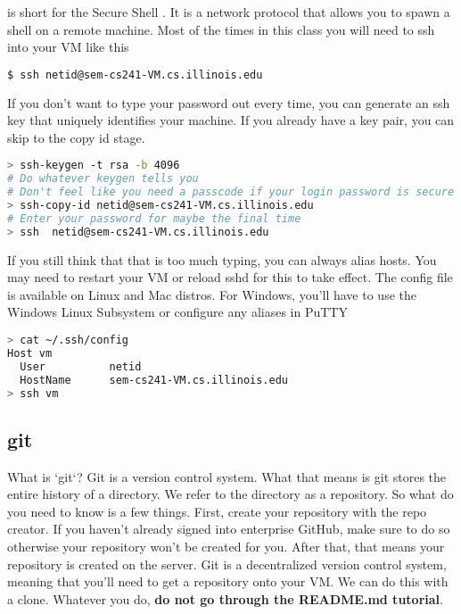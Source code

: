  is short for the Secure Shell \cite{openbsd_ssh}.
It is a network protocol that allows you to spawn a shell on a remote machine.
Most of the times in this class you will need to ssh into your VM like this

\begin{lstlisting}[language=bash]
$ ssh netid@sem-cs241-VM.cs.illinois.edu
\end{lstlisting}

If you don't want to type your password out every time, you can generate an ssh key that uniquely identifies your machine. If you already have a key pair, you can skip to the copy id stage.

\begin{lstlisting}[language=bash]
> ssh-keygen -t rsa -b 4096
# Do whatever keygen tells you
# Don't feel like you need a passcode if your login password is secure
> ssh-copy-id netid@sem-cs241-VM.cs.illinois.edu
# Enter your password for maybe the final time
> ssh  netid@sem-cs241-VM.cs.illinois.edu
\end{lstlisting}

If you still think that that is too much typing, you can always alias hosts.
You may need to restart your VM or reload sshd for this to take effect.
The config file is available on Linux and Mac distros.
For Windows, you'll have to use the Windows Linux Subsystem or configure any aliases in PuTTY

\begin{lstlisting}[language=bash]
> cat ~/.ssh/config
Host vm
  User          netid
  HostName      sem-cs241-VM.cs.illinois.edu
> ssh vm
\end{lstlisting}

\subsection{git}

What is `git`? Git is a version control system. What that means is git stores the entire history of a directory. We refer to the directory as a repository. So what do you need to know is a few things. First, create your repository with the repo creator. If you haven't already signed into enterprise GitHub, make sure to do so otherwise your repository won't be created for you. After that, that means your repository is created on the server. Git is a decentralized version control system, meaning that you'll need to get a repository onto your VM. We can do this with a clone. Whatever you do, \textbf{do not go through the README.md tutorial}.

